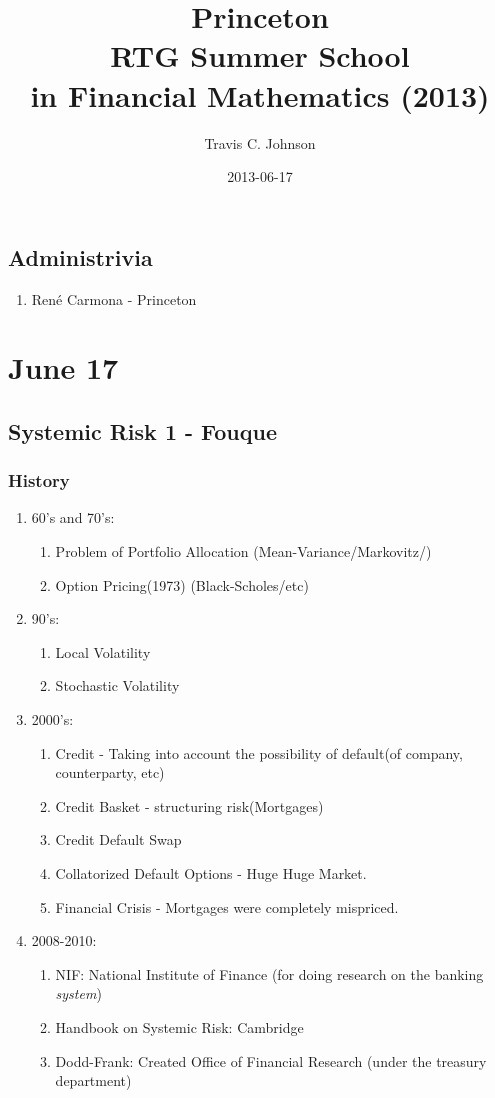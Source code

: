 \documentclass[twocolumn,openany]{book}
\title{Princeton \\ RTG Summer School \\in Financial Mathematics (2013)}
\author{ Travis C. Johnson }
\date{2013-06-17}
\begin{document}
\ifpdf
{}
\else
{}
\fi

\maketitle

\chapter{Administrivia}
\begin{enumerate}
	\item Ren\'e Carmona - Princeton
\end{enumerate}
\part{June 17}
\chapter{Systemic Risk 1 - Fouque}
\section{History}
\begin{enumerate}
	\item 60's and 70's: 
	\begin{enumerate}
		\item Problem of Portfolio Allocation (Mean-Variance/Markovitz/)
		\item Option Pricing(1973) (Black-Scholes/etc)
	\end{enumerate}
	\item 90's:
	\begin{enumerate}
		\item Local Volatility
		\item Stochastic Volatility
	\end{enumerate}
	\item 2000's:
	\begin{enumerate}
		\item Credit - Taking into account the possibility of default(of company, counterparty, etc)
		\item Credit Basket - structuring risk(Mortgages)
		\item Credit Default Swap
		\item Collatorized Default Options - Huge Huge Market.
		\item Financial Crisis - Mortgages were completely mispriced.
	\end{enumerate}
	
	\item 2008-2010:
	\begin{enumerate}
		\item NIF: National Institute of Finance (for doing research on the banking \emph{system})
		\item Handbook on Systemic Risk: Cambridge
		\item Dodd-Frank: Created Office of Financial Research (under the treasury department)
	\end{enumerate}
\end{enumerate}
\end{document}
